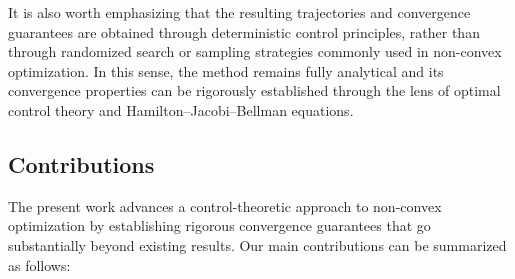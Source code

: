 \documentclass[12pt]{amsart}
\numberwithin{equation}{section}
\theoremstyle{plain}
\begin{document}
It is also worth emphasizing that the resulting trajectories and convergence guarantees are obtained through deterministic control principles, rather than through randomized search or sampling strategies commonly used in non-convex optimization. In this sense, the method remains fully analytical and its convergence properties can be rigorously established through the lens of optimal control theory and Hamilton--Jacobi--Bellman equations.

\subsection*{Contributions}
The present work advances a control-theoretic approach to non-convex optimization by establishing rigorous convergence guarantees that go substantially beyond existing results. Our main contributions can be summarized as follows:
\end{document}
